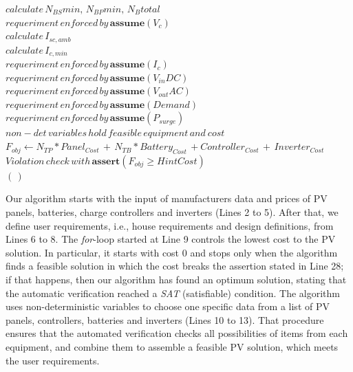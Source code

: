 \documentclass[10pt,conference]{IEEEtran}
\begin{document}
\begin{algorithm}
\begin{algorithmic}[1]
\begin{scriptsize}
	\STATE $calculate \, N_{BS}min, \, N_{BP}min, \, N_{B}total$ \\
	\STATE $requeriment \, enforced \, by \, \textbf{assume}(V_{c})$ \\
 	\STATE $calculate \, I_{sc,amb}$ \\
 	\STATE $calculate \, I_{c,min}$ \\
 	\STATE $requeriment \, enforced \, by \, \textbf{assume}(I_{c})$ \\
	\STATE $requeriment \, enforced \, by \, \textbf{assume}(V_{in}DC)$ \\
	\STATE $requeriment \, enforced \, by \, \textbf{assume}(V_{out}AC)$ \\
	\STATE $requeriment \, enforced \, by \, \textbf{assume}(Demand)$ \\
	\STATE $requeriment \, enforced \, by \, \textbf{assume}(P_{surge})$ \\
	\STATE $non-det \, variables \, hold \, feasible \, equipment \, and \ cost $ \\
	\STATE $F_{obj} \leftarrow  N_{TP}*Panel_{Cost} \, + \, N_{TB}*Battery_{Cost} \, + Controller_{Cost} \, + \, Inverter_{Cost}$ \\
	\STATE $Violation \, check \, with \, \textbf{assert}(F_{obj} \geq HintCost)$ \\
  \ENDFOR
 \RETURN $(\,)$ 
  \end{scriptsize}
 \end{algorithmic} 
 \label{alg:verification-algorithm}
 \end{algorithm}
 
Our algorithm starts with the input of manufacturers data and prices of PV panels, batteries, charge controllers and inverters (Lines 2 to 5). After that, we define user requirements, i.e., house requirements and design definitions, from Lines 6 to 8. The \textit{for}-loop started at Line 9 controls the lowest cost to the PV solution. In particular, it starts with cost $0$ and stops only when the algorithm finds a feasible solution in which the cost breaks the assertion stated in Line 28; if that happens, then our algorithm has found an optimum solution, stating that the automatic verification reached a \textit{SAT} (satisfiable) condition. The algorithm uses non-deterministic variables to choose one specific data from a list of PV panels, controllers, batteries and inverters (Lines 10 to 13). That procedure ensures that the automated verification checks all possibilities of items from each equipment, and combine them to assemble a feasible PV solution, which meets the user requirements.
\end{document}
